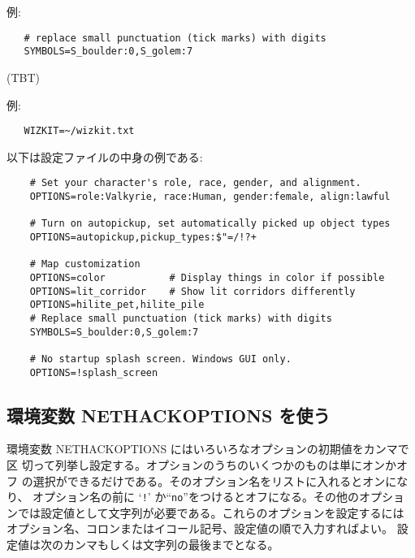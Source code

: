 例:
\begin{verbatim}
   # replace small punctuation (tick marks) with digits
   SYMBOLS=S_boulder:0,S_golem:7
\end{verbatim}

\item[\bb{WIZKIT}]
(TBT)

例:
\begin{verbatim}
   WIZKIT=~/wizkit.txt
\end{verbatim}
\elist

以下は設定ファイルの中身の例である:
\begin{verbatim}
    # Set your character's role, race, gender, and alignment.
    OPTIONS=role:Valkyrie, race:Human, gender:female, align:lawful

    # Turn on autopickup, set automatically picked up object types
    OPTIONS=autopickup,pickup_types:$"=/!?+

    # Map customization
    OPTIONS=color           # Display things in color if possible
    OPTIONS=lit_corridor    # Show lit corridors differently
    OPTIONS=hilite_pet,hilite_pile
    # Replace small punctuation (tick marks) with digits
    SYMBOLS=S_boulder:0,S_golem:7

    # No startup splash screen. Windows GUI only.
    OPTIONS=!splash_screen
\end{verbatim}

\subsection*{環境変数 NETHACKOPTIONS を使う}

環境変数 NETHACKOPTIONS にはいろいろなオプションの初期値をカンマで区
切って列挙し設定する。オプションのうちのいくつかのものは単にオンかオフ
の選択ができるだけである。そのオプション名をリストに入れるとオンになり、
オプション名の前に `{\tt !}' か``{\tt no}''をつけるとオフになる。その他のオプショ
ンでは設定値として文字列が必要である。これらのオプションを設定するには
オプション名、コロンまたはイコール記号、設定値の順で入力すればよい。
設定値は次のカンマもしくは文字列の最後までとなる。

